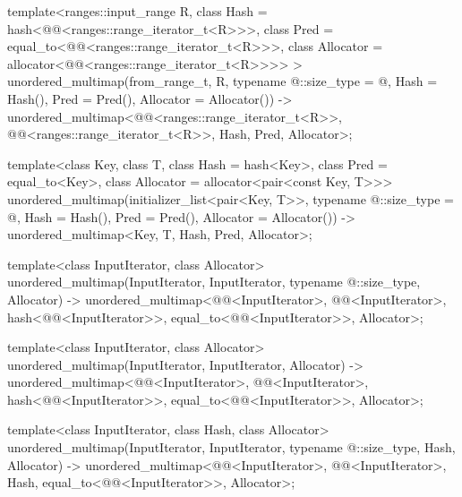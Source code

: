\documentclass{wg21}
\begin{document}
\begin{addedblock}
\begin{codeblock}
template<ranges::input_range R,
    class Hash = hash<@@<ranges::range_iterator_t<R>>>,
    class Pred = equal_to<@@<ranges::range_iterator_t<R>>>,
    class Allocator = allocator<@@<ranges::range_iterator_t<R>>>>
    >
unordered_multimap(from_range_t, R, typename @\seebelow@::size_type = @\seebelow@,
Hash = Hash(), Pred = Pred(), Allocator = Allocator())
-> unordered_multimap<@@<ranges::range_iterator_t<R>>,
    @@<ranges::range_iterator_t<R>>,
    Hash, Pred, Allocator>;
\end{codeblock}
\end{addedblock}
\begin{codeblock}

template<class Key, class T, class Hash = hash<Key>,
class Pred = equal_to<Key>, class Allocator = allocator<pair<const Key, T>>>
unordered_multimap(initializer_list<pair<Key, T>>,
typename @\seebelow@::size_type = @\seebelow@,
Hash = Hash(), Pred = Pred(), Allocator = Allocator())
-> unordered_multimap<Key, T, Hash, Pred, Allocator>;

template<class InputIterator, class Allocator>
unordered_multimap(InputIterator, InputIterator, typename @\seebelow@::size_type, Allocator)
-> unordered_multimap<@@<InputIterator>, @@<InputIterator>,
hash<@@<InputIterator>>,
equal_to<@@<InputIterator>>, Allocator>;

template<class InputIterator, class Allocator>
unordered_multimap(InputIterator, InputIterator, Allocator)
-> unordered_multimap<@@<InputIterator>, @@<InputIterator>,
hash<@@<InputIterator>>,
equal_to<@@<InputIterator>>, Allocator>;

template<class InputIterator, class Hash, class Allocator>
unordered_multimap(InputIterator, InputIterator, typename @\seebelow@::size_type, Hash,
Allocator)
-> unordered_multimap<@@<InputIterator>, @@<InputIterator>, Hash,
equal_to<@@<InputIterator>>, Allocator>;

\end{codeblock}
\end{document}
